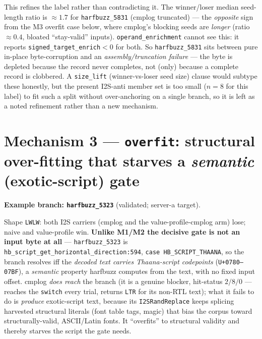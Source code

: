 \documentclass[11pt]{article}
\newcommand{\ste}{\texttt{signed\_target\_enrich}}
\begin{document}
\noindent This refines the label rather than contradicting it. The winner/loser
median seed-length ratio is $\approx 1.7$ for \texttt{harfbuzz\_5831}
(cmplog truncated) --- the \emph{opposite} sign from the M3 overfit case below,
where cmplog's blocking seeds are \emph{longer} (ratio $\approx 0.4$, bloated
``stay-valid'' inputs). \texttt{operand\_enrichment} cannot see this: it reports
\ste{}$<0$ for both. So \texttt{harfbuzz\_5831} sits between pure in-place
byte-corruption and an \emph{assembly/truncation failure} --- the byte is
depleted because the record never completes, not (only) because a complete
record is clobbered. A \texttt{size\_lift} (winner-vs-loser seed size) clause
would subtype these honestly, but the present I2S-anti member set is too small
($n\!=\!8$ for this label) to fit such a split without over-anchoring on a single
branch, so it is left as a noted refinement rather than a new mechanism.

\section{Mechanism 3 --- \texttt{overfit}: structural over-fitting that starves a \emph{semantic} (exotic-script) gate}
\label{sec:overfit}
\textbf{Example branch: \texttt{harfbuzz\_5323}} (validated; server-a target).

Shape \texttt{LWLW}: both I2S carriers (cmplog and the value-profile-cmplog arm)
lose; naive and value-profile win. \textbf{Unlike M1/M2 the decisive gate is not
an input byte at all} --- \texttt{harfbuzz\_5323} is
\texttt{hb\_script\_get\_horizontal\_direction:594}, \texttt{case
HB\_SCRIPT\_THAANA}, so the branch resolves iff the \emph{decoded text carries
Thaana-script codepoints} (\texttt{U+0780--07BF}), a \emph{semantic} property
harfbuzz computes from the text, with no fixed input offset. cmplog \emph{does
reach} the branch (it is a genuine blocker, hit-status $2/8/0$ --- reaches the
\texttt{switch} every trial, returns \texttt{LTR} for its non-RTL text); what it
fails to do is \emph{produce} exotic-script text, because its \texttt{I2SRandReplace}
keeps splicing harvested structural literals (font table tags, magic) that bias
the corpus toward structurally-valid, ASCII/Latin fonts. It ``overfits'' to
structural validity and thereby starves the script the gate needs.
\end{document}

